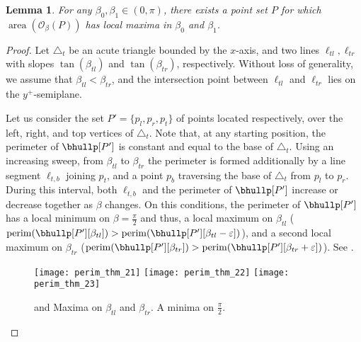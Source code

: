 \documentclass[11pt,letterpaper,english]{article}
\newtheorem{lemma}{Lemma}
\theoremstyle{definition}
\newcommand{\perim}{\operatorname{perim}}
\newcommand{\area}{\operatorname{area}}
\begin{document}
\begin{lemma}\label{apps:perim:lemma:bimodal}
  For any $\beta_0,\beta_1 \in (0,\pi)$, there exists a point set $P$ for which $\area(\mathcal{O}_{\beta}(P))$ has local maxima in $\beta_0$ and $\beta_1$.
\end{lemma}

\begin{proof}
  \newcommand{\topt}{\triangle_t}
  \newcommand{\topal}{\beta_{tl}}
  \newcommand{\topar}{\beta_{tr}}
  \newcommand{\bott}{\triangle_b}
  \newcommand{\botal}{\beta_{bl}}
  \newcommand{\botar}{\beta_{br}}

  Let $\topt$ be an acute triangle bounded by the $x$-axis, and two
  lines $\ell_{tl},\ell_{tr}$ with slopes $\tan(\topal)$ and
  $\tan(\topar)$, respectively. Without loss of generality, we assume
  that $\topal < \topar$, and the intersection point between
  $\ell_{tl}$ and $\ell_{tr}$ lies on the $y^+$-semiplane.

  Let us consider the set $P' = \{ p_l,p_r,p_t \}$ of points located
  respectively, over the left, right, and top vertices of
  $\topt$. Note that, at any starting position, the perimeter of
  $\bhullp[P']$ is constant and equal to the base of $\topt$. Using an
  increasing sweep, from $\topal$ to $\topar$ the perimeter is formed
  additionally by a line segment $\ell_{t,b}$ joining $p_t$, and a
  point $p_b$ traversing the base of $\topt$ from $p_l$ to
  $p_r$. During this interval, both $\ell_{t,b}$ and the perimeter of
  $\bhullp[P']$ increase or decrease together as $\beta$ changes. On
  this conditions, the perimeter of $\bhullp[P']$ has a local minimum
  on $\beta = \frac{\pi}{2}$ and thus, a local maximum on $\topal$
  ($\perim(\bhullp[P'][\topal]) >
  \perim(\bhullp[P'][\topal-\varepsilon])$),
  and a second local maximum on $\topar$
  ($\perim(\bhullp[P'][\topar]) > \perim(\bhullp[P'][\topar +
  \varepsilon])$). See .

  \begin{figure}[ht]
    \centering
    \subcaptionbox{\label{apps:perim:fig:bimodal_1:1}}
    {\texttt{[image: perim\_thm\_21]}}
    \hspace{1cm}
    \subcaptionbox{\label{apps:perim:fig:bimodal_1:2}}
    {\texttt{[image: perim\_thm\_22]}}
    \hspace{1cm}
    \subcaptionbox{\label{apps:perim:fig:bimodal_1:3}}
    {\texttt{[image: perim\_thm\_23]}}
    \caption{ and
       Maxima on $\beta_{tl}$ and
      $\beta_{tr}$.  A minima on
      $\frac{\pi}{2}$.}
    \label{apps:perim:fig:bimodal_1}
  \end{figure}


\end{proof}
\end{document}
